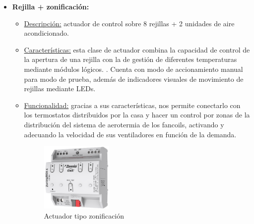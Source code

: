 \begin{itemize}
\item \textbf{Rejilla + zonificación:} 
	\begin{itemize}
	\item\underline{Descripción:} actuador de control sobre 8 rejillas + 2 unidades de aire acondicionado.
	\item \underline{Características:} esta clase de actuador combina la capacidad de control de la apertura de una rejilla con la de gestión de diferentes temperaturas mediante módulos lógicos. . Cuenta con modo de accionamiento manual para modo de prueba, además de indicadores visuales de movimiento de rejillas mediante LEDs.
	\item \underline{Funcionalidad:} gracias a sus características, nos permite conectarlo con los termostatos distribuidos por la casa y hacer un control por zonas de la distribución del sistema de aerotermia de los fancoils, activando y adecuando la velocidad de sus ventiladores en función de la demanda.
	\begin{figure}[h]
	\centering
	\includegraphics[width=0.35\textwidth]{figures/actuador_rejilla.png}   
	\caption{Actuador tipo zonificación}
	\label{fig:actuador_rejilla}
	\end{figure}
	\end{itemize} 


\end{itemize}
